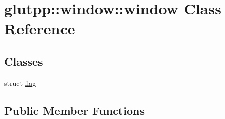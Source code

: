 \hypertarget{classglutpp_1_1window_1_1window}{\section{glutpp\-:\-:window\-:\-:window \-Class \-Reference}
\label{classglutpp_1_1window_1_1window}
}
\subsection*{\-Classes}
\begin{DoxyCompactItemize}
\item 
struct \hyperlink{structglutpp_1_1window_1_1window_1_1flag}{flag}
\end{DoxyCompactItemize}
\subsection*{\-Public \-Member \-Functions}
